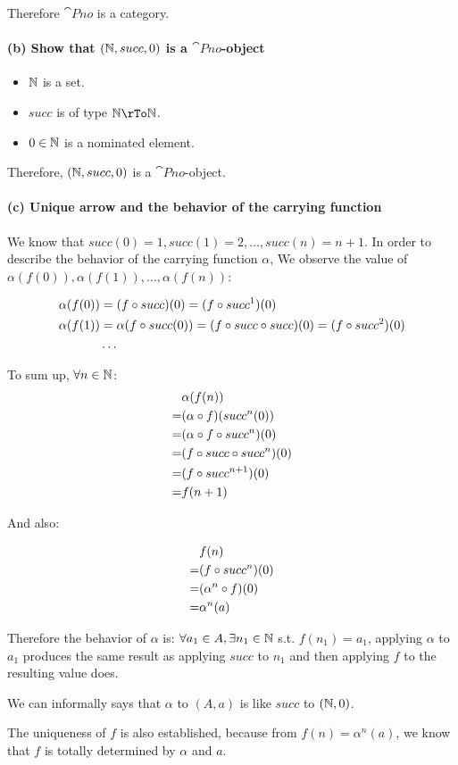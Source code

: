 \documentclass[11pt]{article}
\begin{document}
Therefore $\cat{Pno}$ is a category.

\paragraph{(b) Show that $(\mathbb{N}, succ, 0)$ is a $\cat{Pno}$-object}

\begin{itemize}
  \item $\mathbb{N}$ is a set.
  \item $succ$ is of type $\nat \rTo \nat$.
  \item $0 \in \mathbb{N}$ is a nominated element.
\end{itemize}

Therefore, $(\mathbb{N}, succ, 0)$ is a $\cat{Pno}$-object.

\paragraph{(c) Unique arrow and the behavior of the carrying function}\mbox{}

We know that $succ(0) = 1, succ(1) = 2, \ldots, succ(n) = n + 1$.
In order to describe the behavior of the carrying function $\alpha$,
We observe the value of $\alpha(f(0)), \alpha(f(1)), \ldots, \alpha(f(n))$:

\begin{align*}
\alpha(f(0)) & = (f \circ succ)(0) = (f \circ succ^1)(0) \\
\alpha(f(1)) & = \alpha(f \circ succ (0)) = (f \circ succ \circ succ)(0)
= (f \circ succ^2)(0) \\
& \ldots
\end{align*}

To sum up, $\forall n \in \mathbb{N}$:
\begin{align*}
& \alpha(f(n)) \\
= &(\alpha \circ f)(succ^n(0)) \\
= &(\alpha \circ f \circ succ^n) (0) \\
= &(f \circ succ \circ succ^n) (0) \\
= &(f \circ succ^{n+1})(0) \\
= &f(n+1)
\end{align*}

And also:

\begin{align*}
& f(n) \\
= & (f \circ succ^{n})(0) \\
= & (\alpha^n \circ f)(0) \\
= & \alpha^n(a)
\end{align*}

Therefore the behavior of $\alpha$ is: $\forall a_1 \in A, \exists n_1 \in \mathbb{N}$
s.t. $f(n_1) = a_1$, applying $\alpha$ to $a_1$ produces the same result as
applying $succ$ to $n_1$ and then applying $f$ to the resulting value does.

We can informally says that $\alpha$ to $(A,a)$ is like $succ$ to $(\mathbb{N},0)$.

The uniqueness of $f$ is also established, because from $f(n) = \alpha^n(a)$,
we know that $f$ is totally determined by $\alpha$ and $a$.
\end{document}
